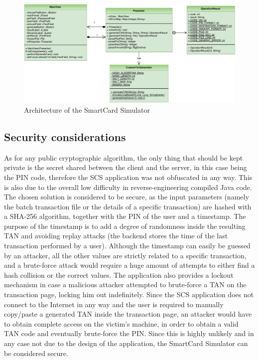 \begin{figure}[h!tbp]
	\centering
	\includegraphics[width=\textwidth]{figures/scs_uml}
	\caption{Architecture of the SmartCard Simulator}
	\label{figure:scs_uml}
\end{figure}


\subsection{Security considerations}
As for any public cryptographic algorithm, the only thing that should be kept private is the secret shared between the client and the server, in this case being the PIN code, therefore the SCS application was not obfuscated in any way. This is also due to the overall low difficulty in reverse-engineering compiled Java code.\newline
The chosen solution is considered to be secure, as the input parameters (namely the batch transaction file or the details of a specific transaction) are hashed with a SHA-256 algorithm, together with the PIN of the user and a timestamp. 
The purpose of the timestamp is to add a degree of randomness inside the resulting TAN and avoiding replay attacks (the backend stores the time of the last transaction performed by a user). Although the timestamp can easily be guessed by an attacker, all the other values are strictly related to a specific transaction, and a brute-force attack would require a huge amount of attempts to either find a hash collision or the correct values. The \gnb{} application also provides a lockout mechanism in case a malicious attacker attempted to brute-force a TAN on the transaction page, locking him out indefinitely.\newline
Since the SCS application does not connect to the Internet in any way and the user is required to manually copy/paste a generated TAN inside the transaction page, an attacker would have to obtain complete access on the victim's machine, in order to obtain a valid TAN code and eventually brute-force the PIN. Since this is highly unlikely and in any case not due to the design of the application, the SmartCard Simulator can be considered secure.
